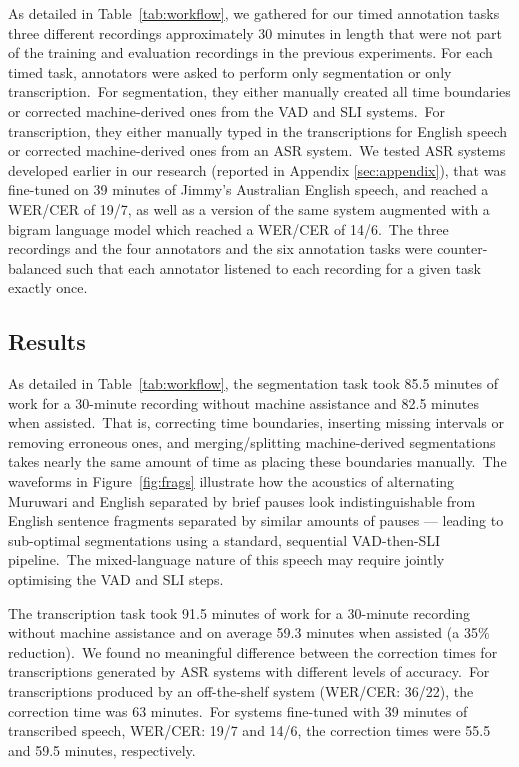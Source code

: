 \documentclass[main.tex]{subfiles}
\begin{document}
As detailed in Table~\ref{tab:workflow}, we gathered for our timed annotation tasks three different recordings approximately 30 minutes in length that were not part of the training and evaluation recordings in the previous experiments.
For each timed task, annotators were asked to perform only segmentation or only transcription.~For segmentation, they either manually created all time boundaries or corrected machine-derived ones from the VAD and SLI systems.~For transcription, they either manually typed in the transcriptions for English speech or corrected machine-derived ones from an ASR system.~We tested ASR systems developed earlier in our research (reported in Appendix \ref{sec:appendix}), that was fine-tuned on 39 minutes of Jimmy's Australian English speech, and reached a WER/CER of 19/7, as well as a version of the same system augmented with a bigram language model which reached a WER/CER of 14/6.~The three recordings and the four annotators and the six annotation tasks were counter-balanced such that each annotator listened to each recording for a given task exactly once.

\subsection{Results}

As detailed in Table~\ref{tab:workflow}, the segmentation task took 85.5 minutes of work for a 30-minute recording without machine assistance and 82.5 minutes when assisted.~That is, correcting time boundaries, inserting missing intervals or removing erroneous ones, and merging/splitting machine-derived segmentations takes nearly the same amount of time as placing these boundaries manually.~The waveforms in Figure~\ref{fig:frags} illustrate how the acoustics of alternating Muruwari and English separated by brief pauses look indistinguishable from English sentence fragments separated by similar amounts of pauses --- leading to sub-optimal segmentations using a standard, sequential VAD-then-SLI pipeline.~The mixed-language nature of this speech may require jointly optimising the VAD and SLI steps.

The transcription task took 91.5 minutes of work for a 30-minute recording without machine assistance and on average 59.3 minutes when assisted (a 35\% reduction).~We found no meaningful difference between the correction times for transcriptions generated by ASR systems with different levels of accuracy.~For transcriptions produced by an off-the-shelf system (WER/CER: 36/22), the correction time was 63 minutes.~For systems fine-tuned with 39 minutes of transcribed speech, WER/CER: 19/7 and 14/6, the correction times were 55.5 and 59.5 minutes, respectively.
\end{document}
